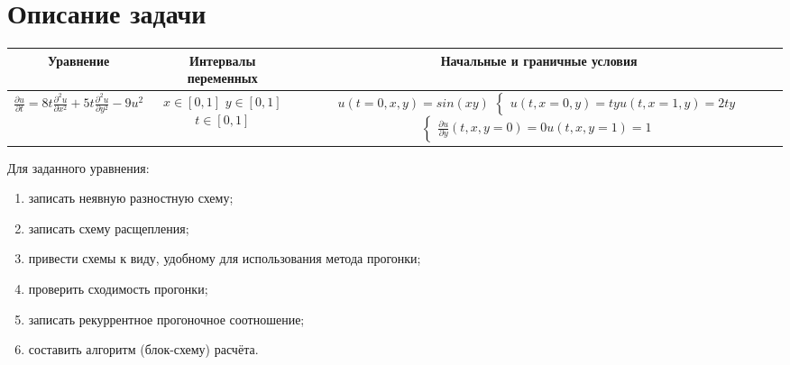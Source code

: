 \documentclass[12pt, a4paper]{report}
\begin{document}
	\section*{Описание задачи}
	\large
	\begin{center}
		\begin{tabular}{||c|c|c||}
			\hline
			Уравнение & \makecell{Интервалы \\ переменных} & Начальные и граничные условия \\

			\hline
			\small 
			$ \frac{\partial u}{\partial t} = 8t\frac{\partial^{2} u}{\partial x^{2}} + 5t\frac{\partial^{2} u}{\partial y^{2}} - 9u^{2} $ & \makecell{$ x \in [0, 1] $ \\ $ y \in [0, 1] $ \\ $ t \in [0, 1] $} & \makecell{$ u(t = 0, x, y) = sin(xy) $ \\ $\begin{cases} u(t, x = 0, y) = ty \\ u(t, x = 1, y) = 2ty \end{cases}$ \\ $\begin{cases} \frac{\partial u}{\partial y}(t, x, y = 0) = 0 \\ u(t, x, y = 1) = 1 \end{cases}$} \\

			\hline
		\end{tabular}
	\end{center}

	Для заданного уравнения:
	\begin{enumerate}
		\item записать неявную разностную схему;
		\item записать схему расщепления;
		\item привести схемы к виду, удобному для использования метода прогонки;
		\item проверить сходимость прогонки;
		\item записать рекуррентное прогоночное соотношение;
		\item составить алгоритм (блок-схему) расчёта.
	\end{enumerate}
\end{document}
